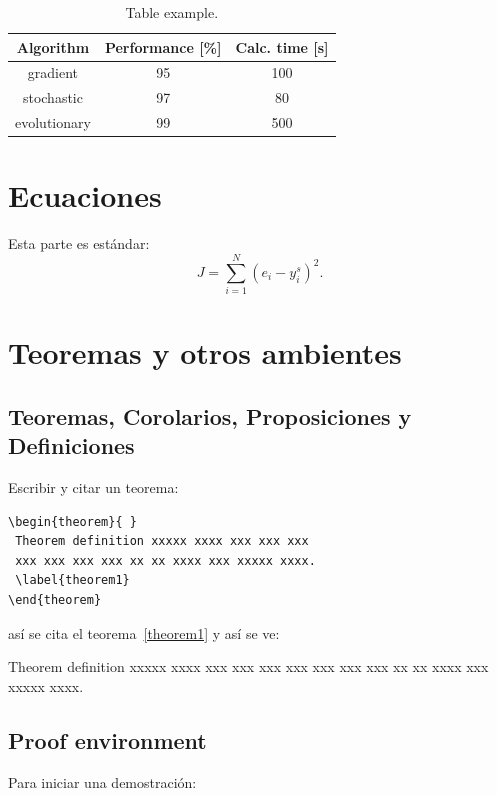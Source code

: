 \documentclass{siep}
\begin{document}
%
\begin{table}[!b]
 \centering
 \caption{Table example.}
 \label{table1}
 \begin{tabular}{|c|c|c|}
   \hline
   Algorithm & Performance [\%]& Calc. time [s]\\\hline\hline
   gradient & 95 & 100\\
   stochastic & 97 & 80\\
   evolutionary & 99 & 500\\\hline
 \end{tabular}
\end{table}


\section{Ecuaciones}
Esta parte es est\'andar:
%
\begin{equation}
  J=\sum_{i=1}^N(e_i-y_i^s)^2.
\end{equation}


\section{Teoremas y otros ambientes}

\subsection{Teoremas, Corolarios, Proposiciones y Definiciones}

Escribir y citar un teorema:

{\small \begin{verbatim}
\begin{theorem}{ }
 Theorem definition xxxxx xxxx xxx xxx xxx
 xxx xxx xxx xxx xx xx xxxx xxx xxxxx xxxx.
 \label{theorem1}
\end{theorem}
\end{verbatim}}
\noindent as\'i se cita el teorema~\ref{theorem1} y as\'i se ve:

\medskip
\begin{theorem}{}
Theorem definition xxxxx xxxx xxx xxx xxx
xxx xxx xxx xxx xx xx xxxx xxx xxxxx xxxx.
 \label{theorem1}
\end{theorem}

\medskip \noindent

\subsection{Proof environment}
Para iniciar una demostraci\'on:
\end{document}

